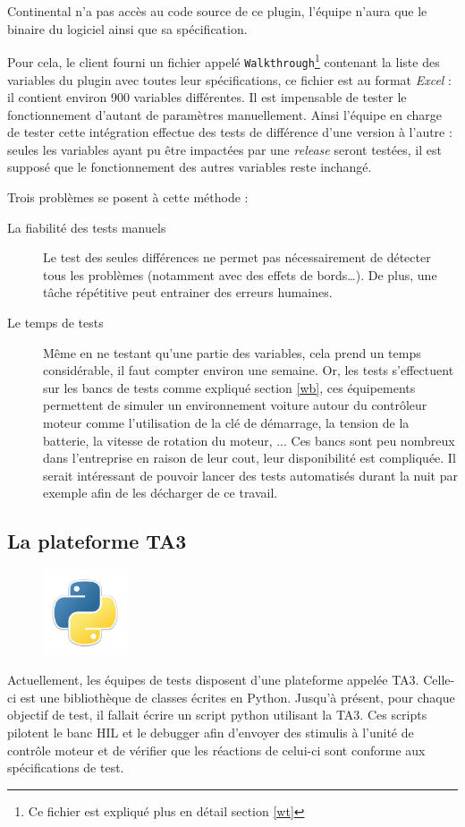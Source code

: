 	\begin{remarque}
		Continental n'a pas accès au code source de ce plugin, l'équipe n'aura que le binaire du logiciel ainsi que sa spécification.	
	\end{remarque}
	
	Pour cela, le client fourni un fichier appelé \texttt{Walkthrough}\footnote{Ce fichier est expliqué plus en détail section \ref{wt}}
	contenant la liste des variables du plugin avec toutes leur spécifications, ce fichier est au format \textit{Excel} : il contient
	environ 900 variables différentes. Il est impensable de tester le fonctionnement d'autant de paramètres manuellement. Ainsi l'équipe en
	charge de tester cette intégration effectue des tests de différence d'une version à l'autre : seules les variables ayant pu être
	impactées par une \textit{release} seront testées, il est supposé que le fonctionnement des autres variables reste inchangé.

	Trois problèmes se posent à cette méthode : 
	\begin{description}
		\item[La fiabilité des tests manuels] Le test des seules différences ne permet pas nécessairement de détecter tous les problèmes (notamment avec des effets de bords\ldots). De plus, une tâche répétitive peut entrainer des erreurs humaines.
		\item[Le temps de tests] Même en ne testant qu'une partie des variables, cela prend un temps considérable, il faut compter environ une semaine.\newline
			Or, les tests s'effectuent sur les bancs de tests comme expliqué section \ref{wb}, ces équipements permettent de simuler un environnement voiture autour du contrôleur moteur comme
			l'utilisation de la clé de démarrage, la tension de la batterie, la vitesse de rotation du moteur, ... Ces bancs sont peu
			nombreux dans l'entreprise en raison de leur cout, leur disponibilité est compliquée. Il serait intéressant de pouvoir lancer
			des tests automatisés durant la nuit par exemple afin de les décharger de ce travail.
	\end{description}

	\subsection{La plateforme TA3}\label{ta3}
\begin{figure}
	\includegraphics[width=2.5cm]{contents/images/python.png}
\end{figure}
	Actuellement, les équipes de tests disposent d'une plateforme appelée TA3. Celle-ci est une bibliothèque de classes écrites en Python. Jusqu'à présent, pour chaque objectif de test, il fallait écrire un script python utilisant la TA3. Ces scripts pilotent le banc HIL et le debugger afin d'envoyer des stimulis à l'unité de contrôle moteur et de vérifier que les réactions de celui-ci sont conforme aux spécifications de test.

